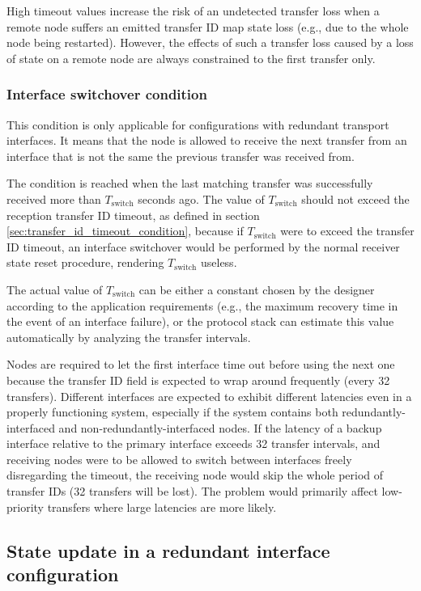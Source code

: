High timeout values increase the risk of an undetected transfer loss when a remote node suffers an emitted transfer ID
map state loss (e.g., due to the whole node being restarted).
However, the effects of such a transfer loss caused by a loss of state on a remote node
are always constrained to the first transfer only.

\subsubsection{Interface switchover condition}\label{sec:transfer_interface_switchover_condition}

This condition is only applicable for configurations with redundant transport interfaces.
It means that the node is allowed to receive the next transfer from an interface that is not the same
the previous transfer was received from.

The condition is reached when the last matching transfer was successfully received more than
$T_\text{switch}$ seconds ago. The value of $T_\text{switch}$ should not exceed the reception transfer
ID timeout, as defined in section \ref{sec:transfer_id_timeout_condition},
because if $T_\text{switch}$ were to exceed the transfer ID timeout, an interface switchover would be
performed by the normal receiver state reset procedure, rendering $T_\text{switch}$ useless.

The actual value of $T_\text{switch}$ can be either a constant chosen by the designer according
to the application requirements (e.g., the maximum recovery time in the event of an interface failure),
or the protocol stack can estimate this value automatically by analyzing the transfer intervals.

Nodes are required to let the first interface time out before using the next one because the
transfer ID field is expected to wrap around frequently (every 32 transfers).
Different interfaces are expected to exhibit different latencies even in a properly functioning system,
especially if the system contains both redundantly-interfaced and non-redundantly-interfaced nodes.
If the latency of a backup interface relative to the primary interface exceeds 32 transfer intervals,
and receiving nodes were to be allowed to switch between interfaces freely disregarding the timeout,
the receiving node would skip the whole period of transfer IDs (32 transfers will be lost).
The problem would primarily affect low-priority transfers where large latencies are more likely.

\subsection{State update in a redundant interface configuration}
\label{sec:transfer_reception_state_update_redundant}

